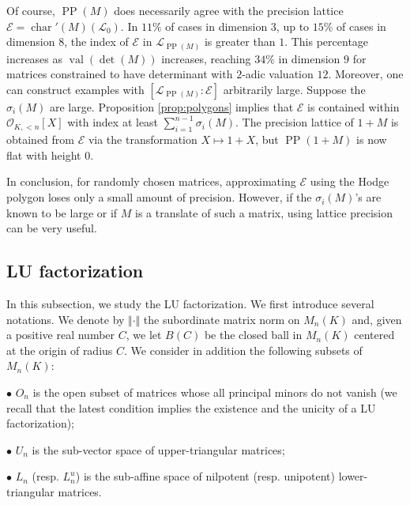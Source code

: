 \documentclass{sig-alternate}
\DeclareMathOperator{\PP}{PP}
\DeclareMathOperator{\val}{val}
\renewcommand{\O}{\mathcal O}
\DeclareMathOperator{\charpoly}{char}
\newcommand{\charp}{\charpoly'}
\begin{document}
Of course, $\PP(M)$ does necessarily agree with the precision lattice 
$\mathcal{E} = \charp(M)(\mathcal L_0)$.  In $11\%$ of cases in 
dimension $3$, up to $15\%$ of cases in dimension $8$, the index of 
$\mathcal{E}$ in $\mathcal{L}_{\PP(M)}$ is greater than $1$.  This 
percentage increases as $\val(\det(M))$ increases, reaching $34\%$ in 
dimension $9$ for matrices constrained to have determinant with $2$-adic 
valuation $12$.
Moreover, one can construct examples with $[\mathcal{L}_{\PP(M)} : 
\mathcal{E}]$ arbitrarily large.  Suppose the $\sigma_i(M)$ are large.  
Proposition \ref{prop:polygons} implies that $\mathcal{E}$ is 
contained within $\O_{K, <n}[X]$ with index at least $\sum_{i=1}^{n-1} 
\sigma_i(M)$.  The precision lattice of $1 + M$ is obtained from 
$\mathcal{E}$ via the transformation $X \mapsto 1 + X$, but $\PP(1 + M)$ 
is now flat with height $0$.

In conclusion, for randomly chosen matrices, approximating $\mathcal{E}$ 
using the Hodge polygon loses only a small amount of precision. However,
if the $\sigma_i(M)$'s are known to be 
large or if $M$ is a translate of such a matrix, using lattice precision 
can be very useful.

\subsection{LU factorization}

In this subsection, we study the LU factorization.
We first introduce several notations.
We denote by $\Vert \cdot \Vert$ the subordinate matrix norm on $M_n(K)$
and, given a positive real number $C$, we let $B(C)$ be the closed ball 
in $M_n(K)$ centered at the origin of radius $C$. We consider in addition
the following subsets of $M_n(K)$:

\noindent $\bullet$
$O_n$ is the open subset of matrices whose all principal 
minors do not vanish (we recall that the latest condition implies the
existence and the unicity of a LU factorization);

\noindent $\bullet$
$U_n$ is the sub-vector space of upper-triangular 
matrices;

\noindent $\bullet$
$L_n$ (resp. $L_n^u$) is the sub-affine space of 
nilpotent (resp. unipotent) lower-triangular matrices.

\smallskip
\end{document}
